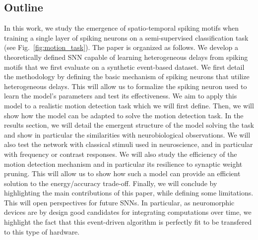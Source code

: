 \documentclass[default]{sn-jnl}%
\theoremstyle{thmstyleone}%
\theoremstyle{thmstyletwo}%
\theoremstyle{thmstylethree}%
\newcommand{\seeFig}[1]{see Fig.~\ref{fig:#1}}%
\begin{document}
\subsection{Outline}
In this work, we study the emergence of spatio-temporal spiking motifs when training a single layer of spiking neurons on a semi-supervised classification task (\seeFig{motion_task}). The paper is organized as follows. We develop a theoretically defined SNN capable of learning heterogeneous delays from spiking motifs that we first evaluate on a synthetic event-based dataset. We first detail the methodology by defining the basic mechanism of spiking neurons that utilize heterogeneous delays. This will allow us to formalize the spiking neuron used to learn the model's parameters and test its effectiveness. We aim to apply this model to a realistic motion detection task which we will first define. Then, we will show how the model can be adapted to solve the motion detection task. In the results section, we will detail the emergent structure of the model solving the task and show in particular the similarities with neurobiological observations. We will also test the network with classical stimuli used in neuroscience, and in particular with frequency or contrast responses.  We will also study the efficiency of the motion detection mechanism and in particular its resilience to synaptic weight pruning. This will allow us to show how such a model can provide an efficient solution to the energy/accuracy trade-off.  Finally, we will conclude by highlighting the main contributions of this paper, while defining some limitations. This will open perspectives for future SNNs.  In particular, as neuromorphic devices are by design good candidates for integrating computations over time, we highlight the fact that this event-driven algorithm is perfectly fit to be transfered to this type of hardware.
%
\end{document}

